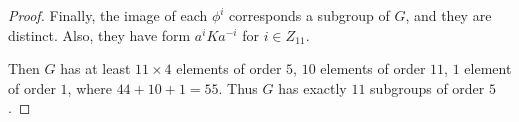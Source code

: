 \documentclass[14pt]{extarticle}
\newcommand{\1}{\{ e \}}
\begin{document}
\begin{proof}
  Finally, the image of each $\phi^i$ corresponds a subgroup of $G$,
  and they are distinct. Also, they have form $a^iKa^{-i}$ for $i \in Z_{11}$.

  Then $G$ has at least $11 \times 4$ elements of order $5$,
  $10$ elements of order $11$, $1$ element of order $1$,
  where $44 + 10 + 1 = 55$. Thus $G$ has exactly $11$ subgroups of order $5$.
\end{proof}
\end{document}
